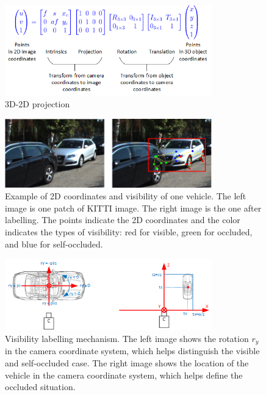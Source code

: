 \documentclass[a4paper,12pt]{article}
\begin{document}
\begin{figure}[H]		
	\includegraphics[width=0.8\textwidth]{projection_matrix.png}
	\caption{3D-2D projection}
	\centering
	\label{3D_2D_projection}
\end{figure}

\begin{figure}[H]		
	\includegraphics[width=0.8\textwidth]{visibilie_eg.png}
	\caption[Example of 2D coordinates and visibility]{Example of 2D coordinates and visibility of one vehicle. The left image is one patch of KITTI image. The right image is the one after labelling. The points indicate the 2D coordinates and the color indicates the types of visibility: red for visible, green for occluded, and blue for self-occluded.}
	\centering
	\label{visibilie_eg}
\end{figure}

\begin{figure}[H]		
	\includegraphics[width=0.8\textwidth]{visibility_imp.png}
	\caption[Visibility labelling mechanism]{Visibility labelling mechanism. The left image shows the rotation $r_y$ in the camera coordinate system, which helps distinguish the visible and self-occluded case. The right image shows the location of the vehicle in the camera coordinate system, which helps define the occluded situation.}
	\centering
	\label{visibility_imp}
\end{figure}
\end{document}
